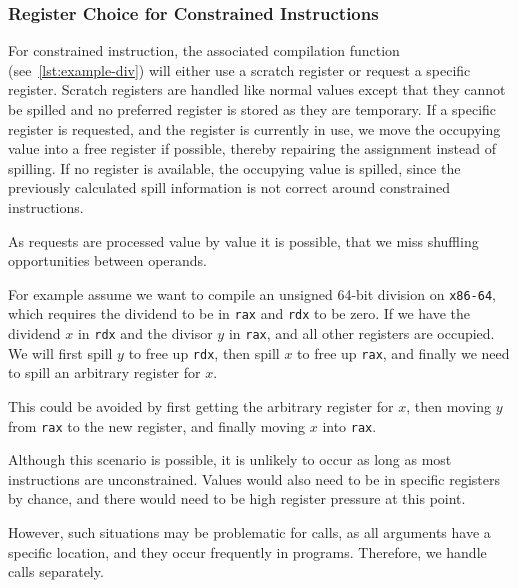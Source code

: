 \subsubsection{Register Choice for Constrained Instructions}

For constrained instruction, the associated compilation function (see~\autoref{lst:example-div}) will either use a scratch register or request a specific register. Scratch registers are handled like normal values except that they cannot be spilled and no preferred register is stored as they are temporary. If a specific register is requested, and the register is currently in use, we move the occupying value into a free register if possible, thereby repairing the assignment instead of spilling. If no register is available, the occupying value is spilled,  since the previously calculated spill information is not correct around constrained instructions. 

As requests are processed value by value it is possible, that we miss shuffling opportunities between operands.

For example assume we want to compile an unsigned 64-bit division on \texttt{x86-64}, which requires the dividend to be in \texttt{rax} and \texttt{rdx} to be zero. If we have the dividend $x$ in \texttt{rdx} and the divisor $y$ in \texttt{rax}, and all other registers are occupied. We will first spill $y$ to free up \texttt{rdx}, then spill $x$ to free up \texttt{rax}, and finally we need to spill an arbitrary register for $x$.

This could be avoided by first getting the arbitrary register for $x$, then moving $y$ from \texttt{rax} to the new register, and finally moving $x$ into \texttt{rax}. 

Although this scenario is possible, it is unlikely to occur as long as most instructions are unconstrained.
Values would also need to be in specific registers by chance, and there would need to be high register pressure at this point. 

However, such situations may be problematic for calls, as all arguments have a specific location, and they occur frequently in programs. Therefore, we handle calls separately.



